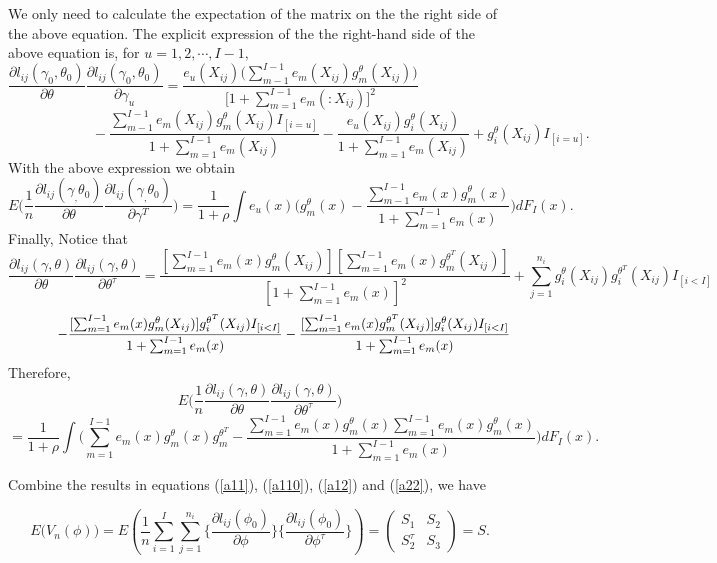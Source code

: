 \documentclass[12]{interact}
\theoremstyle{plain}%
\theoremstyle{definition}
\theoremstyle{remark}
\begin{document}
We only need to calculate the expectation of the matrix on the
the right side of the above equation. The explicit expression of the
the right-hand side of the above equation is, for $u=1, 2, \cdots,
I-1,$
$$\frac{\partial
	l_{ij}(\gamma_0,\theta_0)}{\partial \theta}\frac{\partial
	l_{ij}(\gamma_0,\theta_0)}{\partial
	\gamma_u}=\frac{e_u(X_{ij})\big(\sum_{m-1}^{I-1}
	e_m(X_{ij})g_m^\theta (X_{ij})\big)}{\big[1+\sum_{m=1}^{I-1}e_m(:X_{ij})
	\big]^2}\hspace{2in}$$
$$\hspace{1in}-\frac{\sum_{m-1}^{I-1}e_m(X_{ij})g_m^\theta(X_{ij})I_{[i=u]}}{1+\sum_{m=1}^{I-1}e_m(X_{ij})}
-\frac{e_u(X_{ij})g_i^\theta(X_{ij})}{1+\sum_{m=1}^{I-1}e_m(X_{ij})}+
g_i^\theta(X_{ij}) I_{[i=u]}.$$
With the above expression we obtain
\begin{equation}
	E\Big(\frac{1}{n}\frac{\partial l_{ij}(\gamma_,\theta_0)}{\partial
		\theta}\frac{\partial l_{ij}(\gamma_,\theta_0)}{\partial
		\gamma^T}\Big)=\frac{1}{1+\rho}\int e_u(x)\Big(g_m^\theta(x)-\frac{\sum_{m-1}^{I-1}e_m(x)
		g_m^\theta(x)}{1+\sum_{m=1}^{I-1}e_m(x)}\Big)dF_I(x).
	\label{a12}
\end{equation}
Finally, Notice that
$$
\frac{\partial l_{ij}(\gamma,\theta)}{\partial\theta}
\frac{\partial l_{ij}(\gamma,\theta)}{\partial\theta^\tau}
=\frac{[\sum_{m=1}^{I-1}e_m(x) g_m^\theta(X_{ij})]
	[\sum_{m=1}^{I-1}e_m(x) g_m^{\theta^T}(X_{ij})]}{[1+\sum_{m=1}^{I-1}e_m(x)]^2}+\sum_{j=1}^{n_i} g_i^\theta(X_{ij})g_i^{\theta^T}(X_{ij})I_{[i<I]}$$
$$\hspace{0.5in}-\frac{[\sum_{m=1}^{I-1}e_m(x)g_m^\theta(X_{ij})]g_i^{\theta^T}(X_{ij})I_{[i<I]}}{1+\sum_{m=1}^{I-1}e_m(x)}
-\frac{[\sum_{m=1}^{I-1}e_m(x)g_m^{\theta^T}(X_{ij})]g_i^{\theta}(X_{ij})I_{[i<I]}}{1+\sum_{m=1}^{I-1}e_m(x)}$$
Therefore,
$$
E\Big(\frac{1}{n}\frac{\partial l_{ij}(\gamma,\theta)}{\partial\theta}
\frac{\partial l_{ij}(\gamma,\theta)}{\partial\theta^\tau}\Big)
$$
\begin{equation}
	=\frac{1}{1+\rho}\int
	\Big(\sum_{m=1}^{I-1}e_m(x) g_m^\theta(x)g_m^{\theta^T}
	-\frac{\sum_{m=1}^{I-1}e_m(x)g_m^\theta(x)\sum_{m=1}^{I-1}e_m(x)g_m^\theta(x)}{1+\sum_{m=1}^{I-1}e_m(x)}\Big)dF_I(x).
	\label{a22}
\end{equation}

Combine the results in equations (\ref{a11}), (\ref{a110}),
(\ref{a12}) and (\ref{a22}), we have

\begin{equation}
	E\Big(V_n(\phi)\Big)=E\left(\frac{1}{n}\sum_{i=1}^I\sum_{j=1}^{n_i}
	\{\frac{\partial l_{ij}(\phi_0)}{\partial\phi}\} \{\frac{\partial
		l_{ij}(\phi_0)}{\partial\phi^\tau}
	\}\right)=\left(\begin{array}{cc} S_1 & S_2 \\ S_2^\tau & S_3
	\end{array} \right)=S.
	\label{squarescore}
\end{equation}
\end{document}
